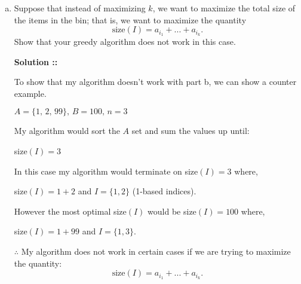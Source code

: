 \documentclass[11pt]{article}
\begin{document}
\begin{enumerate}[(a)]
\begin{verbatim}
// g++ -std=c++23 -O2 -Wall $(NAME).cpp -o $(NAME).exe
#include <algorithm>
#include <iostream>
#include <vector>

struct Item { int size, index; };
bool compareItems(Item i1, Item i2) { return (i1.size < i2.size); }

std::vector<int> ProblemFour(std::vector<Item> items,
                             const int& B)
{
    std::vector<int> I;
    int itemSizeSum = 0;  // 1) s variable = 0.

    // 2) Sort items in ascending order:
    std::sort(items.begin(), items.end(), compareItems);

    // 3) Collect front items until s + a_i > B:
    for (const Item& i : items) {
        itemSizeSum += i.size;
        if (itemSizeSum > B) { break; } // 4) Break summation early.
        I.push_back(i.index);
    }
    return I; // 5) Return resultant I set.
}
\end{verbatim}
\pagebreak

\begin{verbatim}
int main()
{
    std::vector<int> numsToAdd = {4, 10, 32, 2, 44, 132, 60, 23, 1};
    int n = (int)numsToAdd.size();
    int B = 100;

    std::vector<Item> items;
    items.reserve(n);

    for (int i = 0; i < n; ++i) {
        items.push_back({numsToAdd[i], i});
    }
    std::vector<int> I = ProblemFour(items, B);
    std::cout << "Set of n items: ";
    for (const int& size : numsToAdd) {
        std::cout << size << ' ';
    }

    std::cout << "\nReturned I set: ";
    for (const int& index : I) {
        std::cout << index << ' ';
    }
    return 0;
}
\end{verbatim}
\pagebreak

\item
Suppose that instead of maximizing $k$, we want to maximize the total size of the
items in the bin; that is, we want to maximize the quantity
$$\text{size}(I)=a_{i_1}+...+a_{i_k}.$$
Show that your greedy algorithm does not work in this case.

\vspace{5px}\textbf{Solution ::}

To show that my algorithm doesn't work with part b, we can show a counter example.

$A = \{1,\, 2,\, 99\},\,B = 100,\, n = 3$

My algorithm would sort the $A$ set and sum the values up until:

size$(I) = 3$

In this case my algorithm would terminate on size$(I) = 3$ where,

size$(I) = 1 + 2$ and $I = \{1, 2\}$ (1-based indices).

However the most optimal size$(I)$ would be size$(I) = 100$ where,

size$(I) = 1 + 99$ and $I = \{1, 3\}$.

$\therefore$ My algorithm does not work in certain cases if we are trying to maximize
the quantity:
$$\text{size}(I)=a_{i_1}+...+a_{i_k}.$$

\end{enumerate}
\end{document}
